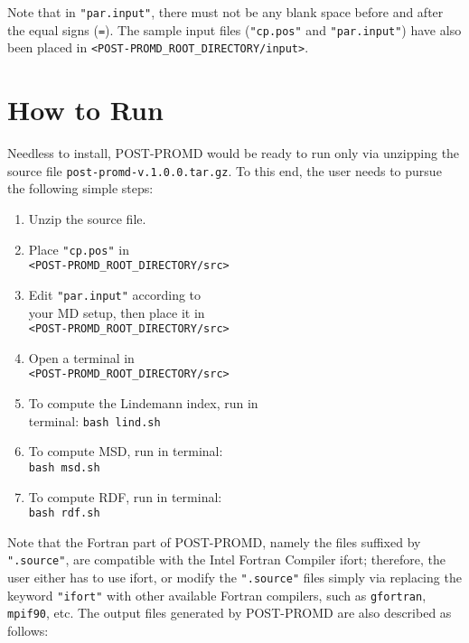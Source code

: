 \documentclass[11pt]{article}
\begin{document}
\begin{sloppypar}
Note that in {\texttt{"par.input"}}, there must not be any blank space before and after the equal signs ({\texttt{=}}). The sample input files ({\texttt{"cp.pos"}} and {\texttt{"par.input"}}) have also been placed in {\texttt{<POST-PROMD\_ROOT\_DIRECTORY/input>}}.
\end{sloppypar}
\section*{How to Run}
\vspace{0.2mm}
Needless to install, POST-PROMD would be ready to run only via unzipping the source file {\texttt{post-promd-v.1.0.0.tar.gz}}. To this end, the user needs to pursue the following simple steps:
\begin{enumerate}
\item Unzip the source file.
\item Place {\texttt{"cp.pos"}} in\\ {\texttt{<POST-PROMD\_ROOT\_DIRECTORY/src>}}
\item Edit {\texttt{"par.input"}} according to\\ your MD setup, then place it in\\ {\texttt{<POST-PROMD\_ROOT\_DIRECTORY/src>}}
\item Open a terminal in\\ {\texttt{<POST-PROMD\_ROOT\_DIRECTORY/src>}}
\item To compute the Lindemann index, run in\\ terminal: {\texttt{bash lind.sh}}
\item To compute MSD, run in terminal:\\ {\texttt{bash msd.sh}}
\item To compute RDF, run in terminal:\\ {\texttt{bash rdf.sh}}
\end{enumerate}
Note that the Fortran part of POST-PROMD, namely the files suffixed by {\texttt{".source"}}, are compatible with the Intel Fortran Compiler ifort; therefore, the user either has to use ifort, or modify the {\texttt{".source"}} files simply via replacing the keyword {\texttt{"ifort"}} with other available Fortran compilers, such as {\texttt{gfortran}}, {\texttt{mpif90}}, etc. The output files generated by POST-PROMD are also described as follows:
\end{document}
